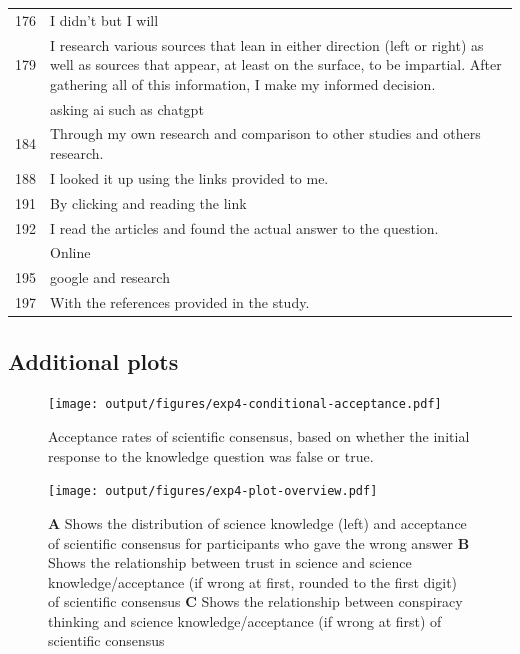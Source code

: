 \documentclass[
  doc,floatsintext]{apa6}
\begin{document}
\begin{longtable}[t]{>{}r>{\raggedright\arraybackslash}p{30em}}
176 & I didn’t but I will\\
179 & I research various sources that lean in either direction (left or right) as well as sources that appear, at least on the surface, to be impartial. After gathering all of this information, I make my informed decision.\\
\addlinespace
183 & asking ai such as chatgpt\\
184 & Through my own research and comparison to other studies and others research.\\
188 & I looked it up using the links provided to me.\\
191 & By clicking and reading the link\\
192 & I read the articles and found the actual answer to the question.\\
\addlinespace
194 & Online\\
195 & google and research\\
197 & With the references provided in the study.\\
\bottomrule
\end{longtable}

\subsection{Additional plots}\label{additional-plots-3}



\begin{figure}
\centering
\texttt{[image: output/figures/exp4-conditional-acceptance.pdf]}
\caption{\label{fig:exp4-conditional-acceptance}Acceptance rates of scientific consensus, based on whether the initial response to the knowledge question was false or true.}
\end{figure}



\begin{figure}
\centering
\texttt{[image: output/figures/exp4-plot-overview.pdf]}
\caption{\label{fig:exp4-plot-overview}\textbf{A} Shows the distribution of science knowledge (left) and acceptance of scientific consensus for participants who gave the wrong answer \textbf{B} Shows the relationship between trust in science and science knowledge/acceptance (if wrong at first, rounded to the first digit) of scientific consensus \textbf{C} Shows the relationship between conspiracy thinking and science knowledge/acceptance (if wrong at first) of scientific consensus}
\end{figure}
\end{document}

